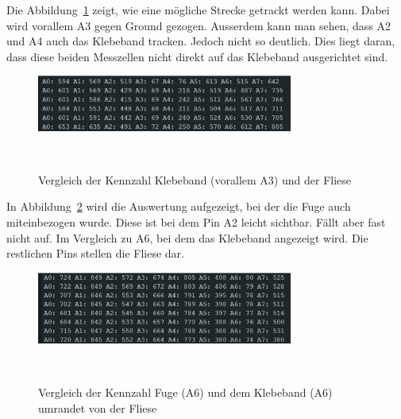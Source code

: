 \documentclass[main.tex]{subfiles} %
\begin{document}
Die Abbildung~\ref{fig:Auswertung_Strecke} zeigt, wie eine mögliche Strecke getrackt werden kann. Dabei wird vorallem A3 gegen Ground gezogen.
Ausserdem kann man sehen, dass A2 und A4 auch das Klebeband tracken. Jedoch nicht so deutlich. Dies liegt daran, dass diese beiden Messzellen nicht
direkt auf das Klebeband ausgerichtet sind.

\begin{figure}[h!]
    \centering
    \includegraphics[width=0.75\textwidth]{./fig_Liniensensor/Auswertung_Strecke}
    \caption{Vergleich der Kennzahl Klebeband (vorallem A3) und der Fliese}~\label{fig:Auswertung_Strecke}
\end{figure}

In Abbildung~\ref{fig:Auswertung_mit_Fuge} wird die Auswertung aufgezeigt, bei der die Fuge auch miteinbezogen wurde. Diese ist bei dem Pin A2 leicht
sichtbar. Fällt aber fast nicht auf. Im Vergleich zu A6, bei dem das Klebeband angezeigt wird. Die restlichen Pins stellen die Fliese dar.

\begin{figure}[h!]
    \centering
    \includegraphics[width=0.75\textwidth]{./fig_Liniensensor/Auswertung_mit_Fuge}
    \caption{Vergleich der Kennzahl Fuge (A6) und dem Klebeband (A6) umrandet von der Fliese}~\label{fig:Auswertung_mit_Fuge}
\end{figure}

\end{document}
